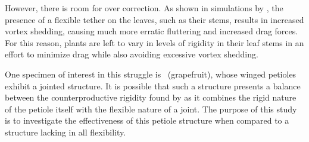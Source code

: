 However, there is room for over correction. As shown in simulations by \citet{miller2012reconfiguration}, the presence of a flexible tether on the leaves, such as their stems, results in increased vortex shedding, causing much more erratic fluttering and increased drag forces. For this reason, plants are left to vary in levels of rigidity in their leaf stems in an effort to minimize drag while also avoiding excessive vortex shedding. 
    
One specimen of interest in this struggle is \Citrusxparadisi\ (grapefruit), whose winged petioles exhibit a jointed structure. It is possible that such a structure presents a balance between the counterproductive rigidity found by \citet{miller2012reconfiguration} as it combines the rigid nature of the petiole itself with the flexible nature of a joint. The purpose of this study is to investigate the effectiveness of this petiole structure when compared to a structure lacking in all flexibility.

